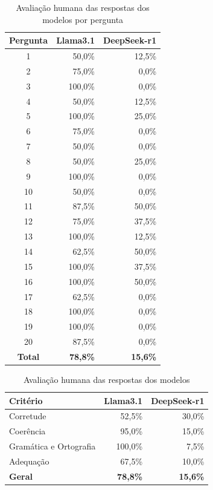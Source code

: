 \begin{table}[H]
    \centering
    \begin{tabular}{c r r}
        \hline
        \textbf{Pergunta} &\textbf{Llama3.1} & \textbf{DeepSeek-r1} \\
        \hline
        1 & 50,0\% & 12,5\% \\
        2 & 75,0\% & 0,0\% \\
        3 & 100,0\% & 0,0\% \\
        4 & 50,0\% & 12,5\% \\
        5 & 100,0\% & 25,0\% \\
        6 & 75,0\% & 0,0\% \\
        7 & 50,0\% & 0,0\% \\
        8 & 50,0\% & 25,0\% \\
        9 & 100,0\% & 0,0\% \\
        10 & 50,0\% & 0,0\% \\
        11 & 87,5\% & 50,0\% \\
        12 & 75,0\% & 37,5\% \\
        13 & 100,0\% & 12,5\% \\
        14 & 62,5\% & 50,0\% \\
        15 & 100,0\% & 37,5\% \\
        16 & 100,0\% & 50,0\% \\
        17 & 62,5\% & 0,0\% \\
        18 & 100,0\% & 0,0\% \\
        19 & 100,0\% & 0,0\% \\
        20 & 87,5\% & 0,0\% \\
        \hline
        \textbf{Total} & \textbf{78,8\%} & \textbf{15,6\%}\\
        \hline
    \end{tabular}
    \caption{Avaliação humana das respostas dos modelos por pergunta}
    \label{tab:testes-avaliacao-respostas-llm-por-pergunta}
\end{table}

\begin{table}[H]
    \centering
    \begin{tabular}{l r r}
        \hline
        \textbf{Critério} &\textbf{Llama3.1} & \textbf{DeepSeek-r1} \\
        \hline
        Corretude & 52,5\% & 30,0\% \\
        Coerência & 95,0\% & 15,0\% \\
        Gramática e Ortografia & 100,0\% & 7,5\% \\
        Adequação & 67,5\% & 10,0\% \\
        \hline
        \textbf{Geral} & \textbf{78,8\%} & \textbf{15,6\%} \\
        \hline
    \end{tabular}
    \caption{Avaliação humana das respostas dos modelos}
    \label{tab:testes-avaliacao-respostas-llm}
\end{table}

